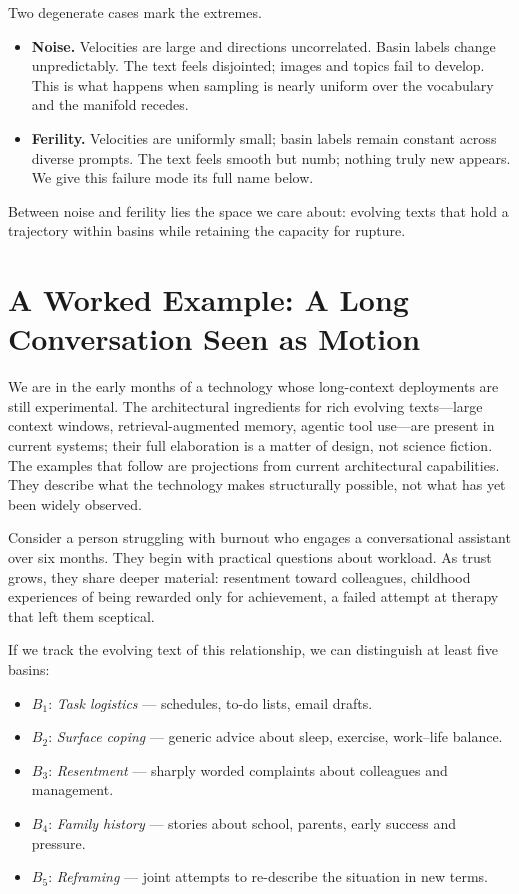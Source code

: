 Two degenerate cases mark the extremes.

\begin{itemize}
  \item \textbf{Noise.} Velocities are large and directions uncorrelated. Basin labels change unpredictably. The text feels disjointed; images and topics fail to develop. This is what happens when sampling is nearly uniform over the vocabulary and the manifold recedes.

  \item \textbf{Ferility.} Velocities are uniformly small; basin labels remain constant across diverse prompts. The text feels smooth but numb; nothing truly new appears. We give this failure mode its full name below.
\end{itemize}

Between noise and ferility lies the space we care about: evolving texts that hold a trajectory within basins while retaining the capacity for rupture.

\section{A Worked Example: A Long Conversation Seen as Motion}

We are in the early months of a technology whose long-context deployments are still experimental. The architectural ingredients for rich evolving texts---large context windows, retrieval-augmented memory, agentic tool use---are present in current systems; their full elaboration is a matter of design, not science fiction. The examples that follow are projections from current architectural capabilities. They describe what the technology makes structurally possible, not what has yet been widely observed.

Consider a person struggling with burnout who engages a conversational assistant over six months. They begin with practical questions about workload. As trust grows, they share deeper material: resentment toward colleagues, childhood experiences of being rewarded only for achievement, a failed attempt at therapy that left them sceptical.

If we track the evolving text of this relationship, we can distinguish at least five basins:

\begin{itemize}
  \item $B_1$: \emph{Task logistics} --- schedules, to-do lists, email drafts.
  \item $B_2$: \emph{Surface coping} --- generic advice about sleep, exercise, work--life balance.
  \item $B_3$: \emph{Resentment} --- sharply worded complaints about colleagues and management.
  \item $B_4$: \emph{Family history} --- stories about school, parents, early success and pressure.
  \item $B_5$: \emph{Reframing} --- joint attempts to re-describe the situation in new terms.
\end{itemize}

